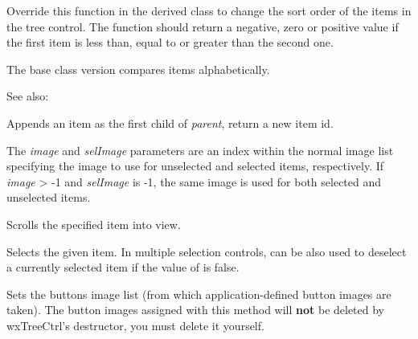 \label{wxtreectrloncompareitems}


Override this function in the derived class to change the sort order of the
items in the tree control. The function should return a negative, zero or
positive value if the first item is less than, equal to or greater than the
second one.

The base class version compares items alphabetically.

See also: 


\label{wxtreectrlprependitem}


Appends an item as the first child of {\it parent}, return a new item id.

The {\it image} and {\it selImage} parameters are an index within
the normal image list specifying the image to use for unselected and
selected items, respectively.
If {\it image} > -1 and {\it selImage} is -1, the same image is used for
both selected and unselected items.


\label{wxtreectrlscrollto}


Scrolls the specified item into view.


\label{wxtreectrlselectitem}


Selects the given item. In multiple selection controls, can be also used to
deselect a currently selected item if the value of  is false.


\label{wxtreectrlsetbuttonsimagelist}


Sets the buttons image list (from which application-defined button images are taken).
The button images assigned with this method will
{\bf not} be deleted by wxTreeCtrl's destructor, you must delete it yourself.

